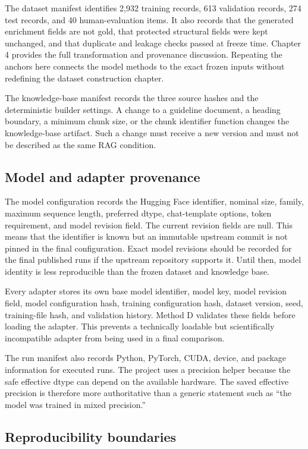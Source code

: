 The dataset manifest identifies 2,932 training records, 613 validation records, 274 test records, and 40 human-evaluation items. It also records that the generated enrichment fields are not gold, that protected structural fields were kept unchanged, and that duplicate and leakage checks passed at freeze time. Chapter 4 provides the full transformation and provenance discussion. Repeating the anchors here connects the model methods to the exact frozen inputs without redefining the dataset construction chapter.

The knowledge-base manifest records the three source hashes and the deterministic builder settings. A change to a guideline document, a heading boundary, a minimum chunk size, or the chunk identifier function changes the knowledge-base artifact. Such a change must receive a new version and must not be described as the same RAG condition.

\subsection{Model and adapter provenance}

The model configuration records the Hugging Face identifier, nominal size, family, maximum sequence length, preferred dtype, chat-template options, token requirement, and model revision field. The current revision fields are null. This means that the identifier is known but an immutable upstream commit is not pinned in the final configuration. Exact model revisions should be recorded for the final published runs if the upstream repository supports it. Until then, model identity is less reproducible than the frozen dataset and knowledge base.

Every adapter stores its own base model identifier, model key, model revision field, model configuration hash, training configuration hash, dataset version, seed, training-file hash, and validation history. Method D validates these fields before loading the adapter. This prevents a technically loadable but scientifically incompatible adapter from being used in a final comparison.

The run manifest also records Python, PyTorch, CUDA, device, and package information for executed runs. The project uses a precision helper because the safe effective dtype can depend on the available hardware. The saved effective precision is therefore more authoritative than a generic statement such as ``the model was trained in mixed precision.''

\subsection{Reproducibility boundaries}

